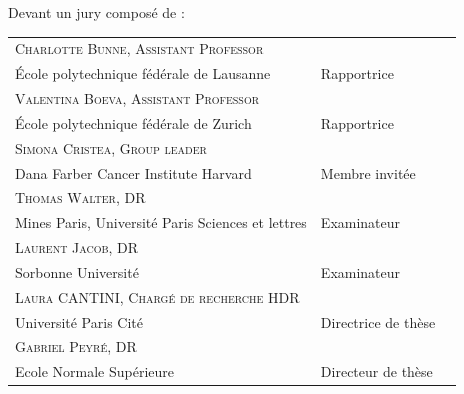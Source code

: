 \documentclass[a4paper,12pt,twoside,english]{book}
\begin{document}
\begin{titlepage}
		\vspace{1cm}
Devant un jury composé de : %
		\begin{center}
			\begin{tabular}{l@{\hskip 1cm}l@{\hskip 1cm}l}
				\textsc{Charlotte Bunne, Assistant Professor}  \\ École polytechnique fédérale de Lausanne &Rapportrice \\
				\textsc{Valentina Boeva, Assistant Professor}  \\ École polytechnique fédérale de Zurich &Rapportrice\\
				\textsc{Simona Cristea, Group leader}  \\ Dana Farber Cancer Institute Harvard &Membre invitée \\
				\textsc{Thomas Walter, DR}  \\ Mines Paris, Université Paris Sciences et lettres &Examinateur \\
				\textsc{Laurent Jacob, DR}  \\ Sorbonne Université &Examinateur  \\
				\textsc{Laura CANTINI, Chargé de recherche HDR}  \\ Université Paris Cité &Directrice de thèse \\
				\textsc{Gabriel Peyré, DR}  \\ Ecole Normale Supérieure &Directeur de thèse \\
			\end{tabular}
		\end{center}

	\newpage %
	\thispagestyle{empty} %
	\end{titlepage}

\renewcommand{\chaptermark}[1]{\markboth{#1}{}}


\frontmatter %


\clearpage
\vspace*{0.2\textheight}
\end{document}
